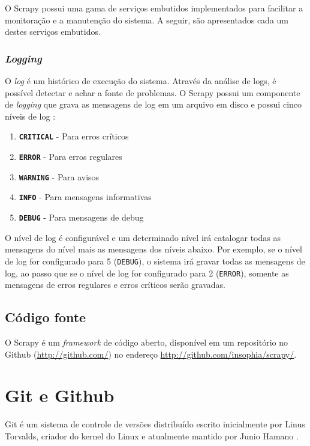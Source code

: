 O Scrapy possui uma gama de serviços embutidos implementados para facilitar a monitoração e a manutenção do sistema. A seguir, são apresentados cada um destes serviços embutidos.

\subsubsection{\textit{Logging}}

O \textit{log} é um histórico de execução do sistema. Através da análise de logs, é possível detectar e achar a fonte de problemas. O Scrapy possui um componente de \textit{logging} que grava as mensagens de log em um arquivo em disco e possui cinco níveis de log \cite{scrapy_log}:

\begin{enumerate}
	\item \texttt{\textbf{CRITICAL}} - Para erros críticos
	\item \texttt{\textbf{ERROR}} - Para erros regulares
	\item \texttt{\textbf{WARNING}} - Para avisos
	\item \texttt{\textbf{INFO}} - Para mensagens informativas
	\item \texttt{\textbf{DEBUG}} - Para mensagens de debug
\end{enumerate}

O nível de log é configurável e um determinado nível irá catalogar todas as mensagens do nível mais as mensagens dos níveis abaixo. Por exemplo, se o nível de log for configurado para 5 (\texttt{DEBUG}), o sistema irá gravar todas as mensagens de log, ao passo que se o nível de log for configurado para 2 (\texttt{ERROR}), somente as mensagens de erros regulares e erros críticos serão gravadas.

\subsection{Código fonte}

O Scrapy é um \emph{framework} de código aberto, disponível em um repositório no Github (\url{http://github.com/}) no endereço \url{http://github.com/insophia/scrapy/}.

\pagebreak
\section{Git e Github}

Git é um sistema de controle de versões distribuído escrito inicialmente por Linus Torvalds, criador do kernel do Linux e atualmente mantido por Junio Hamano \cite{progit}.

